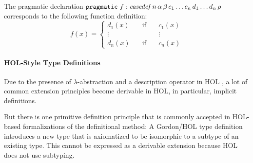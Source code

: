 The pragmatic declaration $\mathtt{pragmatic}\;f:\mathit{casedef}\,n\,\alpha\,\beta\,c_1\ldots c_n\,d_1\ldots d_n\,\rho$
corresponds to the following function definition: \[f(x) =\left\{
\begin{array}{lll}
  d_1(x) & \quad\textrm{if}\quad & c_1(x) \\
 \vdots && \vdots\\
 d_n(x) & \quad\textrm{if}\quad & c_n(x)
\end{array}\right.
\]






\paragraph{HOL-Style Type Definitions}
Due to the presence of $\lambda$-abstraction and a description operator in HOL \cite{churchtypes}, a lot of common extension principles become derivable in HOL, in particular, implicit definitions.

But there is one primitive definition principle that is commonly accepted in HOL-based formalizations of the definitional method: A Gordon/HOL type definition \cite{hol} introduces a new type that is axiomatized to be isomorphic to a subtype of an existing type. This cannot be expressed as a derivable extension because HOL does not use subtyping.


